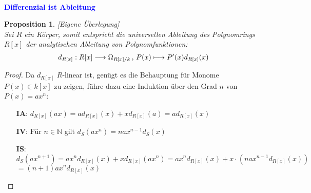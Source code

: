\documentclass[10pt,a4paper]{report}
\newcounter{Aussage}[chapter]
\newtheorem{prop}[Aussage]{Proposition}
\newcommand{\function}[5]{\nolinebreak{#1:#2 \longrightarrow #3 \, , \, #4 \longmapsto #5}}
\newcommand{\divR}[2]{\Omega_{#1/#2}}
\newcommand{\divf}[1]{d_{#1}}
\begin{document}
\ \\
\textcolor{blue}{\textbf{Differenzial ist Ableitung}}
\begin{prop}\label{Differenzial ist Ableitung}\textit{[Eigene Überlegung]}\\
Sei $R$ ein Körper, somit entspricht die universellen Ableitung des Polynomrings $R[x]$ der analytischen Ableitung von Polynomfunktionen:
\begin{gather*}
\function{\divf{R[x]}}{R[x]}{\divR{R[x]}{k}}{P(x)}{P'(x)\divf{R[x]}(x)}
\end{gather*}
\end{prop}
\begin{proof}
Da $\divf{R[x]}$ $R$-linear ist, genügt es die Behauptung für Monome $P(x) \in k[x]$ zu zeigen, führe dazu eine Induktion über den Grad $n$ von $P(x) = ax^n$:
\begin{spacing}{1.5}
\begin{itemize}
\item[\textbf{IA}:] $\divf{R[x]}(ax) = a\divf{R[x]}(x) + x\divf{R[x]}(a) = a\divf{R[x]}(x)$
\item[\textbf{IV}:] Für $n \in \mathbb{N}$ gilt $\divf{S}(ax^n) = na x^{n-1}\divf{S}(x)$
\item[\textbf{IS}:] 
$\divf{S}(ax^{n+1}) = ax^n\divf{R[x]}(x) + x\divf{R[x]}(ax^n) = ax^n\divf{R[x]}(x) + x \cdot (na x^{n-1}\divf{R[x]}(x))$\\
$ = (n+1)ax^n\divf{R[x]}(x)$
\end{itemize}
\end{spacing}
\end{proof}
\end{document}
